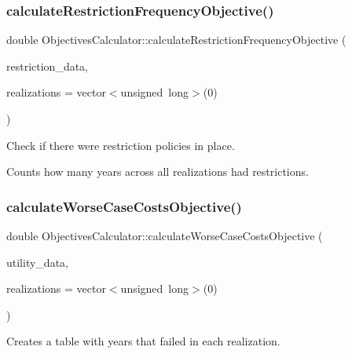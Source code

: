 \subsubsection{\texorpdfstring{calculate\+Restriction\+Frequency\+Objective()}{calculateRestrictionFrequencyObjective()}}
{\footnotesize\ttfamily double Objectives\+Calculator\+::calculate\+Restriction\+Frequency\+Objective (\begin{DoxyParamCaption}\item[{const vector$<$ \mbox{\hyperlink{classRestrictionsDataCollector}{Restrictions\+Data\+Collector}} $\ast$$>$ \&}]{restriction\+\_\+data,  }\item[{vector$<$ unsigned long $>$}]{realizations = {\ttfamily vector$<$unsigned~long$>$(0)} }\end{DoxyParamCaption})\hspace{0.3cm}{\ttfamily [static]}}

Check if there were restriction policies in place.

Counts how many years across all realizations had restrictions. \mbox{\label{classObjectivesCalculator_a74cf53d4a7abbb2ea34304844262a826_a74cf53d4a7abbb2ea34304844262a826}} 
\subsubsection{\texorpdfstring{calculate\+Worse\+Case\+Costs\+Objective()}{calculateWorseCaseCostsObjective()}}
{\footnotesize\ttfamily double Objectives\+Calculator\+::calculate\+Worse\+Case\+Costs\+Objective (\begin{DoxyParamCaption}\item[{const vector$<$ \mbox{\hyperlink{classUtilitiesDataCollector}{Utilities\+Data\+Collector}} $\ast$$>$ \&}]{utility\+\_\+data,  }\item[{vector$<$ unsigned long $>$}]{realizations = {\ttfamily vector$<$unsigned~long$>$(0)} }\end{DoxyParamCaption})\hspace{0.3cm}{\ttfamily [static]}}

Creates a table with years that failed in each realization.

